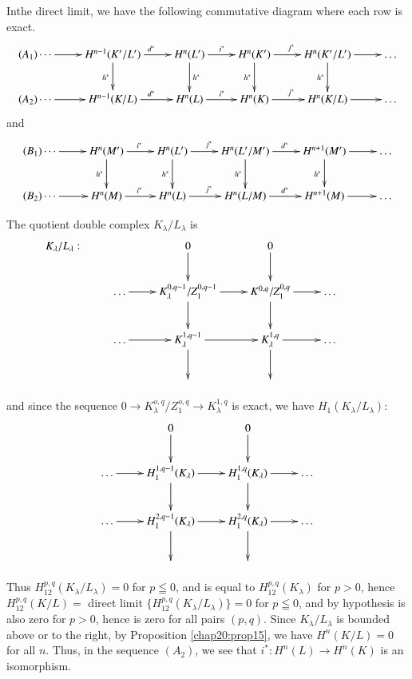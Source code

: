   In\pageoriginale the direct limit, we have the following commutative
  diagram where each row is exact.  
{\fontsize{8}{10}\selectfont
\[
\xymatrix{
(A_1) \cdots \ar[r] & H^{n-1}(K'/L')
  \ar[r]^{d^{\ast}}\ar[d]_{h^{\ast}} &
  H^n(L')\ar[r]^{i^{\ast}}\ar[d]^{h^{\ast}} & H^n(K')
  \ar[r]^{j^{\ast}}\ar[d]_{h^{\ast}} & H^n(K'/L')
  \ar[r]\ar[d]_{h^{\ast}} & \ldots\\
(A_2) \cdots \ar[r] & H^{n-1}(K/L) \ar[r]^{d^{\ast}} & H^n(L)
  \ar[r]^{i^{\ast}} & H^n(K) \ar[r]^{j^{\ast}} & H^n(K/L) \ar[r] & \ldots
}
\]}\relax
and
{\fontsize{8}{10}\selectfont
\[
\xymatrix{
(B_1) \cdots \ar[r] & H^{n}(M')
  \ar[r]^{i^{\ast}}\ar[d]_{h^{\ast}} &
  H^n(L')\ar[r]^{j^{\ast}}\ar[d]_{h^{\ast}} & H^n(L'/M')
  \ar[r]^{d^{\ast}}\ar[d]_{h^{\ast}} & H^{n+1}(M')
  \ar[r]\ar[d]_{h^{\ast}} & \ldots\\
(B_2) \cdots \ar[r] & H^{n}(M) \ar[r]^{i^{\ast}} & H^n(L)
  \ar[r]^{j^{\ast}} & H^n(L/M) \ar[r]^{d^{\ast}} & H^{n+1}(M) \ar[r] &
  \ldots 
}
\]}\relax
  
   The quotient double complex $K_{\lambda}/L_{\lambda}$ is 
\[
\xymatrix{
K_{\lambda}/L_{\lambda}: &  & 0\ar[d] & 0 \ar[d]& \\
& \ldots \ar[r] & K^{0,q-1}_{\lambda} / Z^{0,q-1}_1 \ar[r]\ar[d] &
K^{0,q}/Z^{0,q}_1 \ar[r]\ar[d] & \ldots\\
& \ldots \ar[r] & K^{1,q-1}_{\lambda} \ar[r]\ar[d] & K^{1,q}_{\lambda}
\ar[r]\ar[d] & \ldots\\
& & & & & 
}
\]

and since the sequence $0 \rightarrow K^{o,q}_{\lambda} / Z^{o,q}_1
\rightarrow K^{1,q}_{\lambda}$ is exact, we have  $H_{1}(K_{\lambda}/L_{\lambda})$: 
\[
\xymatrix{
 & 0\ar[d] & 0 \ar[d]& \\
\ldots \ar[r] & H^{1,q-1}_1(K_{\lambda})  \ar[r]\ar[d] &
H^{1,q}_1(K_{\lambda}) \ar[r]\ar[d] & \ldots\\
\ldots \ar[r] & H^{2,q-1}_1(K_{\lambda}) \ar[r]\ar[d] & H^{2,q}_1(K_{\lambda})
\ar[r]\ar[d] & \ldots\\
& & & 
}
\]\pageoriginale

Thus $H^{p,q}_{12} (K_{\lambda}/ L_{\lambda})  = 0$ for $p \leqq 0$,
and is equal to $H^{p,q}_{12}(K_{\lambda})$ for $p>0$, hence
$H^{p,q}_{12}(K/L) = $ direct limit $\bigg\{ H^{p,q}_{12}(K_{\lambda}
/ L_{\lambda}) \bigg\} = 0$ for $p \leqq 0$, and by hypothesis is also
zero for $p>0$, hence is zero for all pairs $(p,q)$. Since
$K_{\lambda}/ L_{\lambda}$ is bounded above or to the right, by
Proposition \ref{chap20:prop15}, we have $H^n (K/L) = 0$ for all
$n$. Thus, in the 
sequence $(A_2)$, we see that $i^* : H^n(L) \rightarrow H^n (K)$ is an
isomorphism.  
   
